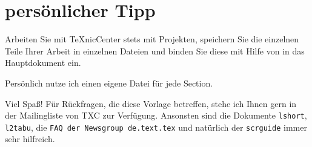\documentclass[a4paper,%
twoside,							%
headsepline = true,				%
footsepline = true,				%
headings=normal,
listof = totoc,					%
bibliography = totoc,		%
listof = entryprefix,		%
]
{scrartcl}
\begin{document}
\section{persönlicher Tipp}
Arbeiten Sie mit TeXnicCenter stets mit Projekten, speichern Sie die einzelnen Teile Ihrer Arbeit in einzelnen Dateien und binden Sie diese mit Hilfe von \verb## in das Hauptdokument ein.

Persönlich nutze ich einen eigene Datei für jede Section. 

Viel Spaß! Für Rückfragen, die diese Vorlage betreffen, stehe ich Ihnen gern in der Mailingliste von TXC zur Verfügung. Ansonsten sind die Dokumente \texttt{lshort}, \texttt{l2tabu}, die \texttt{FAQ der Newsgroup de.text.tex} und natürlich der \texttt{scrguide} immer sehr hilfreich.

\newpage
{}
\listoftables			%
\newpage
\listoffigures				%
\newpage
\lstlistoflistings
\newpage
\newpage
%
\nocite{*} %
\renewcommand{\bibname}{Literatur}
\nocite{*} %
\printbibheading[title={Quellenverzeichnis}]
\printbibliography[nottype = online, heading	= subbibliography, title = Literaturverzeichnis]
\printbibliography[
	type 		= online,						%
	heading	= subbibliography,
	title		= {Online-Quellen}	%
]
\end{document}
